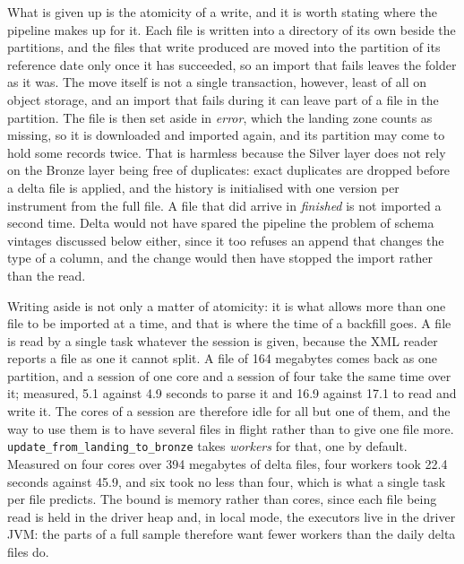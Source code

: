 What is given up is the atomicity of a write, and it is worth stating where the pipeline makes up for it. Each file is written into a directory of its own beside the partitions, and the files that write produced are moved into the partition of its reference date only once it has succeeded, so an import that fails leaves the folder as it was. The move itself is not a single transaction, however, least of all on object storage, and an import that fails during it can leave part of a file in the partition. The file is then set aside in \emph{error}, which the landing zone counts as missing, so it is downloaded and imported again, and its partition may come to hold some records twice. That is harmless because the Silver layer does not rely on the Bronze layer being free of duplicates: exact duplicates are dropped before a delta file is applied, and the history is initialised with one version per instrument from the full file. A file that did arrive in \emph{finished} is not imported a second time. Delta would not have spared the pipeline the problem of schema vintages discussed below either, since it too refuses an append that changes the type of a column, and the change would then have stopped the import rather than the read.

Writing aside is not only a matter of atomicity: it is what allows more than one file to be imported at a time, and that is where the time of a backfill goes. A file is read by a single task whatever the session is given, because the XML reader reports a file as one it cannot split. A file of 164 megabytes comes back as one partition, and a session of one core and a session of four take the same time over it; measured, 5.1 against 4.9 seconds to parse it and 16.9 against 17.1 to read and write it. The cores of a session are therefore idle for all but one of them, and the way to use them is to have several files in flight rather than to give one file more. \verb|update_from_landing_to_bronze| takes \emph{workers} for that, one by default. Measured on four cores over 394 megabytes of delta files, four workers took 22.4 seconds against 45.9, and six took no less than four, which is what a single task per file predicts. The bound is memory rather than cores, since each file being read is held in the driver heap and, in local mode, the executors live in the driver JVM: the parts of a full sample therefore want fewer workers than the daily delta files do.

